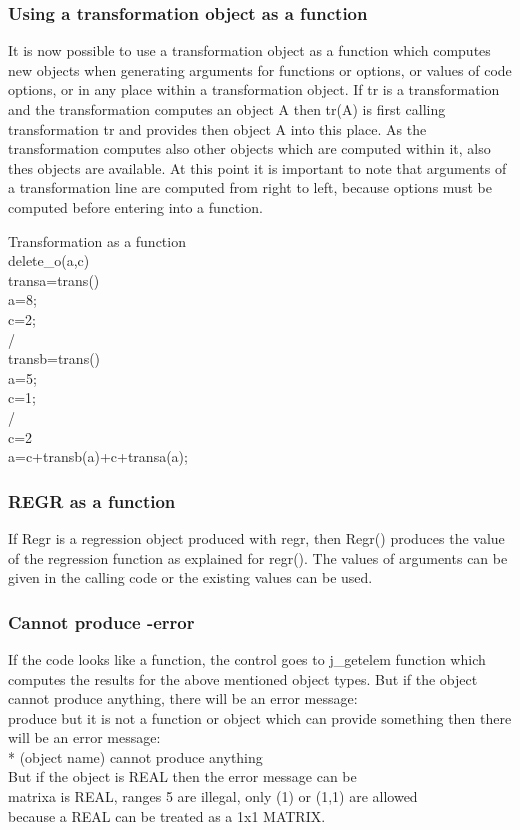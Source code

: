 \subsubsection{Using a transformation object as a function}
\label{transfunc}
It is now possible to use a transformation object as a function which computes new
objects when generating arguments for functions or options,
or values of code options, or in any place within a transformation object.
If {tr} is a transformation and the transformation computes an object {A} then
{tr(A)} is first calling transformation {tr} and provides then object {A} into this place.
As the transformation computes also other objects which are computed within it, also thes objects
are available. At this point it is important to note that arguments of
a transformation line are computed from right to left, because options must be computed before
entering into a function.
\begin{example}[transfunc]Transformation as a function\\
\label{transfunc}
\textcolor{VioletRed}{delete\_o}(a,c)\\
transa=\textcolor{VioletRed}{trans}()\\
a=8;\\
c=2;\\
/\\
transb=\textcolor{VioletRed}{trans}()\\
a=5;\\
c=1;\\
/\\
c=2\\
a=c+transb(a)+c+transa(a);
\end{example}
\subsubsection{REGR as a function}
\label{regrfunc}
If Regr is a regression object produced with regr, then Regr() produces
the value of the regression function as explained for \textcolor{VioletRed}{regr}(). The values of arguments
can be given in the calling code or the existing values can be used.
\subsubsection{Cannot produce -error}
\label{isnotfunc}
If the code looks like a function, the control goes to j\_getelem function
which computes the results for the above mentioned object types. But if
the object cannot produce anything, there will be an error message:\\
produce   but it is not a function or object which can provide something then
there will be an error message:\\
* (object name) cannot produce anything\\
But if the object is REAL then the error message can be \\
matrixa is REAL, ranges            5  are illegal, only (1) or (1,1) are allowed\\
because a REAL can be treated as a 1x1 MATRIX.

